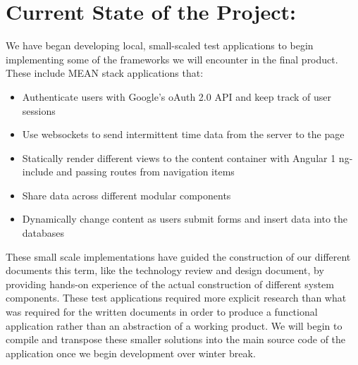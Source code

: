 \documentclass[journal,10pt,onecolumn,compsoc]{IEEEtran} \usepackage[margin=1.0in]{geometry} \usepackage{pdfpages}
\begin{document}
    \section{Current State of the Project:}
    We have began developing local, small-scaled test applications to begin implementing some of the frameworks we will encounter in the final product. These include MEAN stack applications that:
        \begin{itemize}
            \item Authenticate users with Google's oAuth 2.0 API and keep track of user sessions
            \item Use websockets to send intermittent time data from the server to the page
            \item Statically render different views to the content container with Angular 1 ng-include and passing routes from navigation items
            \item Share data across different modular components
            \item Dynamically change content as users submit forms and insert data into the databases
        \end{itemize}

    \noindent These small scale implementations have guided the construction of our different documents this term, like the technology review and design document, by providing hands-on experience of the actual construction of different system components. These test applications required more explicit research than what was required for the written documents in order to produce a functional application rather than an abstraction of a working product. We will begin to compile and transpose these smaller solutions into the main source code of the application once we begin development over winter break.
    
    
\end{document}
